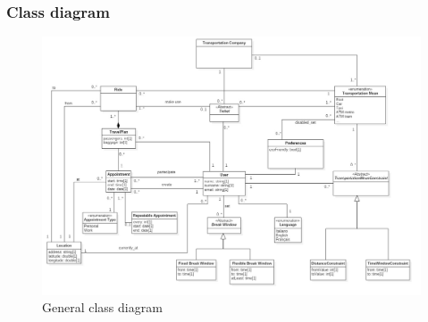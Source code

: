 	\subsubsection{Class diagram}
		\begin{figure}[H]
			\centerline{\includegraphics[width=\paperwidth-1]{Images/ClassDiagram}}
			\caption{General class diagram}
		\end{figure}
